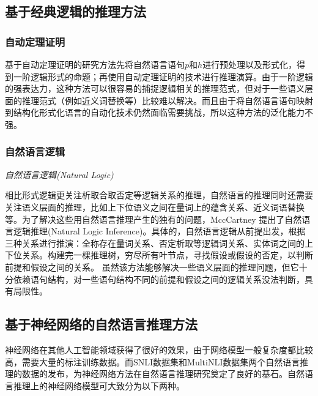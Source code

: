 \documentclass[UTF8,11pt,a4paper,nofonts]{ctexart}
\begin{document}
\subsection{基于经典逻辑的推理方法}

\subsubsection{自动定理证明}

基于自动定理证明的研究方法\cite{Bos2005RecognisingTE, Abzianidze2017APL}先将自然语言语句$p$和$h$进行预处理以及形式化，得到一阶逻辑形式的命题；再使用自动定理证明\cite{Chang1973SymbolicLA}的技术进行推理演算。由于一阶逻辑的强表达力，这种方法可以很容易的捕捉逻辑相关的推理范式，但对于一些语义层面的推理范式（例如近义词替换等）比较难以解决。而且由于将自然语言语句映射到结构化形式化语言的自动化技术仍然面临需要挑战，所以这种方法的泛化能力不强。

\subsubsection{自然语言逻辑}

\textit{自然语言逻辑(Natural Logic)}

相比形式逻辑更关注析取合取否定等逻辑关系的推理，自然语言的推理同时还需要关注语义层面的推理，比如上下位语义之间在量词上的蕴含关系、近义词语替换等。为了解决这些用自然语言推理产生的独有的问题，MccCartney 提出了自然语言逻辑推理(Natural Logic Inference)\cite{MacCartney2007NaturalLF, Angeli2014NaturalLINL, }。具体的，自然语言逻辑从前提出发，根据三种关系进行推演：全称存在量词关系、否定析取等逻辑词关系、实体词之间的上下位关系。构建完一棵推理树，穷尽所有叶节点，寻找假设或假设的否定，以判断前提和假设之间的关系。
虽然该方法能够解决一些语义层面的推理问题，但它十分依赖语句结构，对一些语句结构不同的前提和假设之间的逻辑关系没法判断，具有局限性。




\subsection{基于神经网络的自然语言推理方法}

神经网络在其他人工智能领域获得了很好的效果，由于网络模型一般复杂度都比较高，需要大量的标注训练数据。而SNLI数据集\cite{Bowman2015ALA}和MultiNLI数据集\cite{Nangia2017TheR2}两个自然语言推理的数据的发布，为神经网络方法在自然语言推理研究奠定了良好的基石。自然语言推理上的神经网络模型可大致分为以下两种。
\end{document}
